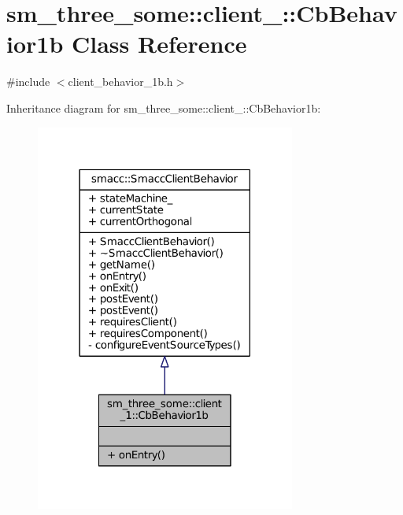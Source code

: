 \hypertarget{classsm__three__some_1_1client__1_1_1CbBehavior1b}{}\section{sm\+\_\+three\+\_\+some\+:\+:client\+\_\+:\+:Cb\+Behavior1b Class Reference}
\label{classsm__three__some_1_1client__1_1_1CbBehavior1b}


{\ttfamily \#include $<$client\+\_\+behavior\+\_\+1b.\+h$>$}



Inheritance diagram for sm\+\_\+three\+\_\+some\+:\+:client\+\_\+:\+:Cb\+Behavior1b\+:
\nopagebreak
\begin{figure}[H]
\begin{center}
\leavevmode
\includegraphics[width=242pt]{classsm__three__some_1_1client__1_1_1CbBehavior1b__inherit__graph}
\end{center}
\end{figure}


